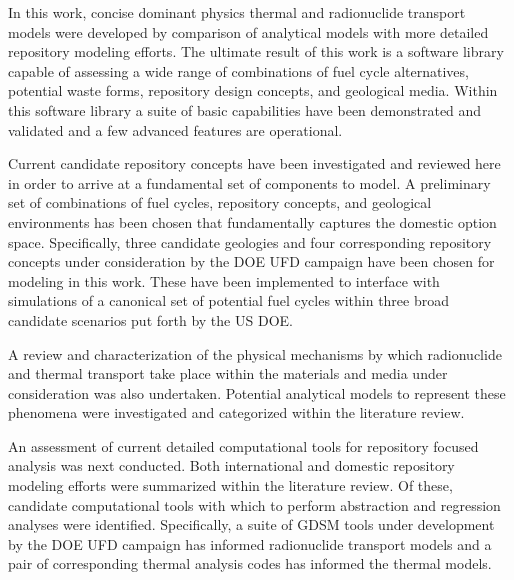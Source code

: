 
In this work, concise dominant physics thermal and radionuclide transport models 
were developed by comparison of analytical models with more 
detailed repository modeling efforts. The ultimate result of this work is a 
software library capable of assessing a wide range of combinations 
of fuel cycle alternatives, potential waste forms, repository design concepts, 
and geological media. Within this software library a suite of basic 
capabilities have been demonstrated and validated and a few advanced 
features are operational. 


Current candidate repository concepts have been investigated and reviewed here 
in order to arrive at a fundamental set of components to model. A preliminary 
set of combinations of fuel cycles, repository concepts, and geological 
environments has 
been chosen that fundamentally captures the domestic option space. 
Specifically, three candidate geologies and four corresponding repository 
concepts under consideration by the \gls{DOE} \gls{UFD} campaign have been 
chosen for modeling in this work. These have been implemented to interface
with \Cyclus simulations of a canonical set of potential fuel cycles within 
three broad candidate scenarios put forth by the \gls{US} \gls{DOE}.


A review and characterization of the physical mechanisms by which radionuclide 
and thermal transport take place within the materials and media under 
consideration was also undertaken. Potential analytical models to represent  
these phenomena were investigated and categorized within the literature review. 


An assessment of current detailed computational tools for
repository focused analysis was next conducted. Both international and domestic
repository modeling efforts were summarized within the literature review. Of 
these, candidate computational tools with which to perform abstraction and 
regression analyses were identified. Specifically, a suite of \gls{GDSM} tools 
under development by the \gls{DOE} \gls{UFD} campaign has informed radionuclide 
transport models and a pair of corresponding thermal analysis codes has 
informed the thermal models.
 

